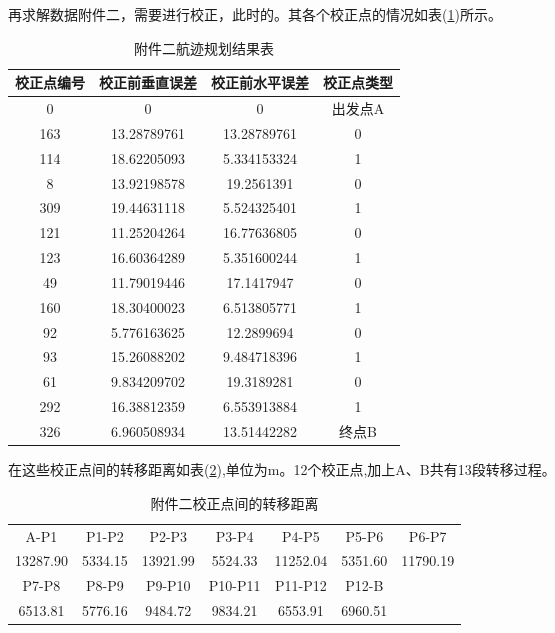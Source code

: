 \newpage
再求解数据附件二，需要进行校正，此时的。其各个校正点的情况如表(\ref{tab:res-qu1-2})所示。
\begin{table}[!htbp]
	\caption{附件二航迹规划结果表} 
	\label{tab:res-qu1-2}
	\centering
	\begin{tabular}{cccc} 
		\toprule[1.5pt] 
        校正点编号 & 校正前垂直误差 & 校正前水平误差 & 校正点类型 \\
		\midrule[1pt] 
        0     & 0     & 0     & 出发点A \\
        163   & 13.28789761 & 13.28789761 & \multicolumn{1}{c}{0} \\
        114   & 18.62205093 & 5.334153324 & \multicolumn{1}{c}{1} \\
        8     & 13.92198578 & 19.2561391 & \multicolumn{1}{c}{0} \\
        309   & 19.44631118 & 5.524325401 & \multicolumn{1}{c}{1} \\
        121   & 11.25204264 & 16.77636805 & \multicolumn{1}{c}{0} \\
        123   & 16.60364289 & 5.351600244 & \multicolumn{1}{c}{1} \\
        49    & 11.79019446 & 17.1417947 & \multicolumn{1}{c}{0} \\
        160   & 18.30400023 & 6.513805771 & \multicolumn{1}{c}{1} \\
        92    & 5.776163625 & 12.2899694 & \multicolumn{1}{c}{0} \\
        93    & 15.26088202 & 9.484718396 & \multicolumn{1}{c}{1} \\
        61    & 9.834209702 & 19.3189281 & \multicolumn{1}{c}{0} \\
        292   & 16.38812359 & 6.553913884 & \multicolumn{1}{c}{1} \\
        326   & 6.960508934 & 13.51442282 & 终点B \\
		\bottomrule[1.5pt] 
\end{tabular}\end{table}

在这些校正点间的转移距离如表(\ref{tab:qu1-2-dis}),单位为m。12个校正点,加上A、B共有13段转移过程。
\begin{table}[!htbp]
	\caption{附件二校正点间的转移距离} 
	\label{tab:qu1-2-dis}
	\centering
	\begin{tabular}{ccccccc} 
		\hline
        A-P1  & P1-P2 & P2-P3 & P3-P4 & P4-P5 & P5-P6 & P6-P7 \\ 
        13287.90 & 5334.15 & 13921.99 & 5524.33 & 11252.04 & 5351.60 & 11790.19 \\
		\hline \hline
        P7-P8 & P8-P9 & P9-P10 & P10-P11 & P11-P12 & P12-B &  \\ 
        6513.81 & 5776.16 & 9484.72 & 9834.21 & 6553.91 & 6960.51 &  \\
		\hline
\end{tabular}\end{table}

